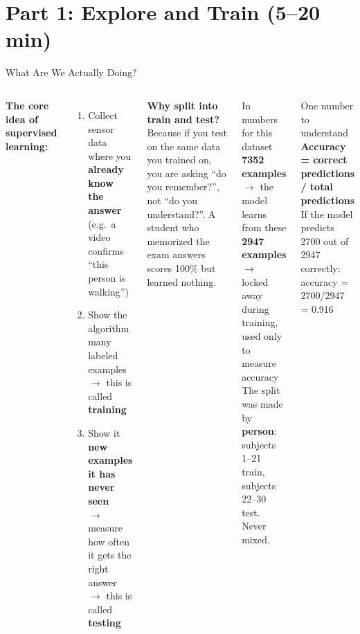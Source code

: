 \documentclass[aspectratio=169,11pt]{beamer}
\begin{document}
\section{Part 1: Explore and Train (5--20 min)}

\begin{frame}[shrink=5]{What Are We Actually Doing?}
    \begin{columns}
        \textbf{The core idea of supervised learning:}
        \begin{enumerate}
            \item Collect sensor data where you \textbf{already know the answer}\\(e.g.\ a video confirms ``this person is walking'')
            \item Show the algorithm many labeled examples\\$\rightarrow$ this is called \textbf{training}
            \item Show it \textbf{new examples it has never seen}\\$\rightarrow$ measure how often it gets the right answer\\$\rightarrow$ this is called \textbf{testing}
        \end{enumerate}

        \vspace{0.2cm}
        \textbf{Why split into train and test?}\\Because if you test on the same data you trained on, you are asking ``do you remember?'', not ``do you understand?''. A student who memorized the exam answers scores 100\% but learned nothing.

        \begin{exampleblock}{In numbers for this dataset}
            \textbf{7352 examples} $\rightarrow$ the model learns from these\\[4pt]
            \textbf{2947 examples} $\rightarrow$ locked away during training, used only to measure accuracy\\[4pt]
            The split was made by \textbf{person}: subjects 1--21 train, subjects 22--30 test. Never mixed.
        \end{exampleblock}

        \vspace{0.2cm}
        \begin{alertblock}{One number to understand}
            \textbf{Accuracy = correct predictions / total predictions}\\If the model predicts 2700 out of 2947 correctly: accuracy = 2700/2947 = 0.916
        \end{alertblock}
    \end{columns}
\end{frame}
\end{document}

